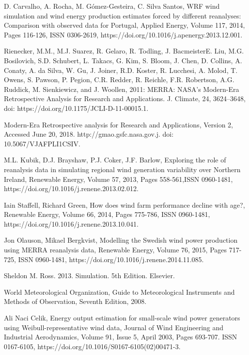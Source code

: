 \begin{thebibliography}{99}
\begin{singlespace}
 D. Carvalho, A. Rocha, M. Gómez-Gesteira, C. Silva Santos, WRF wind simulation and wind energy production estimates forced by different reanalyses: Comparison with observed data for Portugal, Applied Energy, Volume 117, 2014, Pages 116-126, ISSN 0306-2619, https://doi.org/10.1016/j.apenergy.2013.12.001.

Rienecker, M.M., M.J. Suarez, R. Gelaro, R. Todling, J. BacmeisterE. Liu, M.G. Bosilovich, S.D. Schubert, L. Takacs, G. Kim, S. Bloom, J. Chen, D. Collins, A. Conaty, A. da Silva, W. Gu, J. Joiner, R.D. Koster, R. Lucchesi, A. Molod, T. Owens, S. Pawson, P. Pegion, C.R. Redder, R. Reichle, F.R. Robertson, A.G. Ruddick, M. Sienkiewicz, and J. Woollen, 2011: MERRA: NASA’s Modern-Era Retrospective Analysis for Research and Applications. J. Climate, 24, 3624–3648, doi: https://doi.org/10.1175/JCLI-D-11-00015.1.

 Modern-Era Retrospective analysis for Research and Applications, Version 2, Accessed June 20, 2018. http://gmao.gsfc.nasa.gov.j. doi: 10.5067/VJAFPLI1CSIV.

 M.L. Kubik, D.J. Brayshaw, P.J. Coker, J.F. Barlow, Exploring the role of reanalysis data in simulating regional wind generation variability over Northern Ireland,
Renewable Energy, Volume 57, 2013, Pages 558-561,ISSN 0960-1481, https://doi.org/10.1016/j.renene.2013.02.012.

 Iain Staffell, Richard Green, How does wind farm performance decline with age?, Renewable Energy, Volume 66, 2014, Pages 775-786, ISSN 0960-1481, https://doi.org/10.1016/j.renene.2013.10.041.

 Jon Olauson, Mikael Bergkvist, Modelling the Swedish wind power production using MERRA reanalysis data, Renewable Energy, Volume 76, 2015, Pages 717-725, ISSN 0960-1481, https://doi.org/10.1016/j.renene.2014.11.085.

 Sheldon M. Ross. 2013. Simulation. 5th Edition. Elsevier. 

 World Meteorological Organization, Guide to Meteorological Instruments and Methods of Observation, Seventh Edition, 2008. 

Ali Naci Celik, Energy output estimation for small-scale wind power generators using Weibull-representative wind data, Journal of Wind Engineering and Industrial Aerodynamics, Volume 91, Issue 5, April 2003, Pages 693-707. ISSN 0167-6105, https://doi.org/10.1016/S0167-6105(02)00471-3.


\end{singlespace}
\end{thebibliography}
